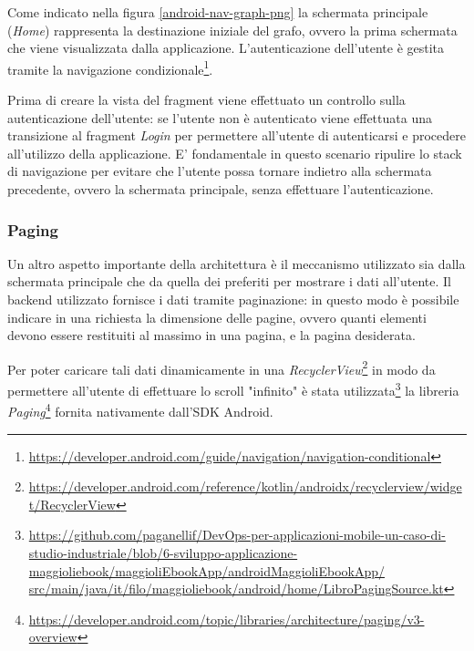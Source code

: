 Come indicato nella figura \ref{android-nav-graph-png} la schermata principale (\textit{Home}) rappresenta la destinazione iniziale del grafo, ovvero la prima schermata che viene visualizzata dalla applicazione. L'autenticazione dell'utente è gestita tramite la navigazione condizionale\footnote{\href{https://developer.android.com/guide/navigation/navigation-conditional}{https://developer.android.com/guide/navigation/navigation-conditional}}. 

Prima di creare la vista del fragment viene effettuato un controllo sulla autenticazione dell'utente: se l'utente non è autenticato viene effettuata una transizione al fragment \textit{Login} per permettere all'utente di autenticarsi e procedere all'utilizzo della applicazione. E' fondamentale in questo scenario ripulire lo stack di navigazione per evitare che l'utente possa tornare indietro alla schermata precedente, ovvero la schermata principale, senza effettuare l'autenticazione.

\subsubsection*{Paging}
\label{pagingsec}
Un altro aspetto importante della architettura è il meccanismo utilizzato sia dalla schermata principale che da quella dei preferiti per mostrare i dati all'utente. Il backend utilizzato fornisce i dati tramite paginazione: in questo modo è possibile indicare in una richiesta la dimensione delle pagine, ovvero quanti elementi devono essere restituiti al massimo in una pagina, e la pagina desiderata. 

Per poter caricare tali dati dinamicamente in una \textit{RecyclerView}\footnote{\href{https://developer.android.com/reference/kotlin/androidx/recyclerview/widget/RecyclerView}{https://developer.android.com/reference/kotlin/androidx/recyclerview/widget/RecyclerView}} in modo da permettere all'utente di effettuare lo scroll "infinito" è stata utilizzata\footnote{\href{https://github.com/paganellif/DevOps-per-applicazioni-mobile-un-caso-di-studio-industriale/blob/6-sviluppo-applicazione-maggioliebook/maggioliEbookApp/androidMaggioliEbookApp/src/main/java/it/filo/maggioliebook/android/home/LibroPagingSource.kt}{https://github.com/paganellif/DevOps-per-applicazioni-mobile-un-caso-di-studio-industriale/blob/6-sviluppo-applicazione-maggioliebook/maggioliEbookApp/androidMaggioliEbookApp/\\src/main/java/it/filo/maggioliebook/android/home/LibroPagingSource.kt}} la libreria \textit{Paging}\footnote{\href{https://developer.android.com/topic/libraries/architecture/paging/v3-overview}{https://developer.android.com/topic/libraries/architecture/paging/v3-overview}} fornita nativamente dall'SDK Android.

